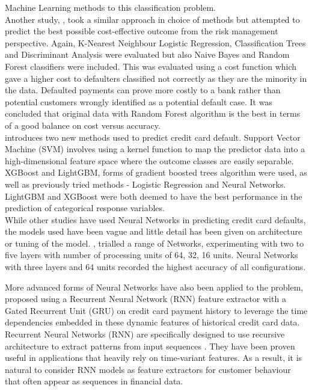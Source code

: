 \documentclass[
]{article}
\begin{document}
Machine Learning methods to this classification problem.\\
Another study, \citep{Neema2017TheCO}, took a similar approach in choice
of methods but attempted to predict the best possible cost-effective
outcome from the risk management perspective. Again, K-Nearest Neighbour
Logistic Regression, Classification Trees and Discriminant Analysis were
evaluated but also Naive Bayes and Random Forest classifiers were
included. This was evaluated using a cost function which gave a higher
cost to defaulters classified not correctly as they are the minority in
the data. Defaulted payments can prove more costly to a bank rather than
potential customers wrongly identified as a potential default case. It
was concluded that original data with Random Forest algorithm is the
best in terms of a good balance on cost versus accuracy.\\
\citet{Yang2018-rt} introduces two new methods used to predict credit
card default. Support Vector Machine (SVM) involves using a kernel
function to map the predictor data into a high-dimensional feature space
where the outcome classes are easily separable. XGBoost and LightGBM,
forms of gradient boosted trees algorithm were used, as well as
previously tried methods - Logistic Regression and Neural Networks.
LightGBM and XGBoost were both deemed to have the best performance in
the prediction of categorical response variables.\\
While other studies have used Neural Networks in predicting credit card
defaults, the models used have been vague and little detail has been
given on architecture or tuning of the model. \citet{dnn2}, trialled a
range of Networks, experimenting with two to five layers with number of
processing units of 64, 32, 16 units. Neural Networks with three layers
and 64 units recorded the highest accuracy of all configurations.

More advanced forms of Neural Networks have also been applied to the
problem, \citet{8682212} proposed using a Recurrent Neural Network (RNN)
feature extractor with a Gated Recurrent Unit (GRU) on credit card
payment history to leverage the time dependencies embedded in these
dynamic features of historical credit card data. Recurrent Neural
Networks (RNN) are specifically designed to use recursive architecture
to extract patterns from input sequences \citep{Goodfellow-et-al-2016}.
They have been proven useful in applications that heavily rely on
time-variant features. As a result, it is natural to consider RNN models
as feature extractors for customer behaviour that often appear as
sequences in financial data.
\end{document}
